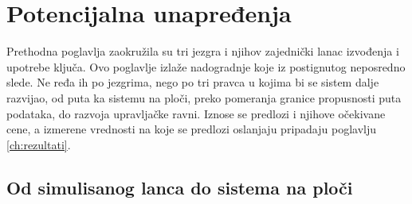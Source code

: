 \chapter{Potencijalna unapređenja}
\label{ch:unapredjenja}

Prethodna poglavlja zaokružila su tri jezgra i njihov zajednički lanac izvođenja i upotrebe ključa. Ovo poglavlje izlaže nadogradnje koje iz postignutog neposredno slede. Ne ređa ih po jezgrima, nego po tri pravca u kojima bi se sistem dalje razvijao, od puta ka sistemu na ploči, preko pomeranja granice propusnosti puta podataka, do razvoja upravljačke ravni. Iznose se predlozi i njihove očekivane cene, a izmerene vrednosti na koje se predlozi oslanjaju pripadaju poglavlju \ref{ch:rezultati}.

\section{Od simulisanog lanca do sistema na ploči}
\label{sec:unap_sistem}

